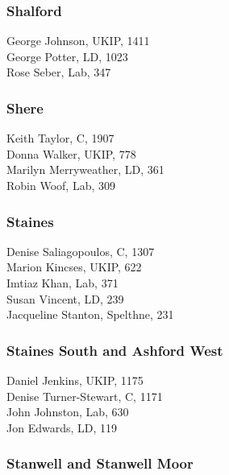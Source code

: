\documentclass[a4paper,openany,10pt]{book}
\begin{document}
\subsubsection*{Shalford}



George Johnson, UKIP, 1411\\
George Potter, LD, 1023\\
Rose Seber, Lab, 347\\


\subsubsection*{Shere}



Keith Taylor, C, 1907\\
Donna Walker, UKIP, 778\\
{Marilyn Merryweather}, LD, 361\\
Robin Woof, Lab, 309\\


\subsubsection*{Staines}



Denise Saliagopoulos, C, 1307\\
Marion Kincses, UKIP, 622\\
Imtiaz Khan, Lab, 371\\
Susan Vincent, LD, 239\\
Jacqueline Stanton, Spelthne, 231\\


\subsubsection*{Staines South and Ashford West}



Daniel Jenkins, UKIP, 1175\\
{Denise Turner-Stewart}, C, 1171\\
John Johnston, Lab, 630\\
Jon Edwards, LD, 119\\


\subsubsection*{Stanwell and Stanwell Moor}
\end{document}
